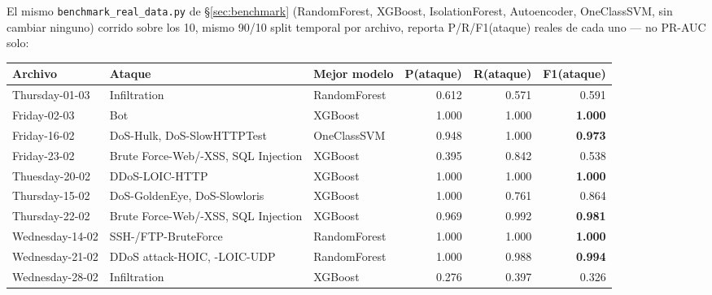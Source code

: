 \documentclass[11pt]{article}
\newcommand{\code}[1]{\texttt{\small #1}}
\begin{document}
El mismo \code{benchmark\_real\_data.py} de \S\ref{sec:benchmark} (RandomForest, XGBoost,
IsolationForest, Autoencoder, OneClassSVM, sin cambiar ninguno) corrido sobre los 10, mismo
90/10 split temporal por archivo, reporta P/R/F1(ataque) reales de cada uno --- no PR-AUC solo:

\begin{center}
\begin{longtable}{@{}lp{4.0cm}lrrr@{}}
\toprule
\textbf{Archivo} & \textbf{Ataque} & \textbf{Mejor modelo} & \textbf{P(ataque)} & \textbf{R(ataque)} & \textbf{F1(ataque)} \\
\midrule
\endhead
Thursday-01-03 & Infiltration & RandomForest & 0.612 & 0.571 & 0.591 \\
Friday-02-03 & Bot & XGBoost & 1.000 & 1.000 & \textbf{1.000} \\
Friday-16-02 & DoS-Hulk, DoS-SlowHTTPTest & OneClassSVM & 0.948 & 1.000 & \textbf{0.973} \\
Friday-23-02 & Brute Force-Web/-XSS, SQL Injection & XGBoost & 0.395 & 0.842 & 0.538 \\
Thuesday-20-02 & DDoS-LOIC-HTTP & XGBoost & 1.000 & 1.000 & \textbf{1.000} \\
Thursday-15-02 & DoS-GoldenEye, DoS-Slowloris & XGBoost & 1.000 & 0.761 & 0.864 \\
Thursday-22-02 & Brute Force-Web/-XSS, SQL Injection & XGBoost & 0.969 & 0.992 & \textbf{0.981} \\
Wednesday-14-02 & SSH-/FTP-BruteForce & RandomForest & 1.000 & 1.000 & \textbf{1.000} \\
Wednesday-21-02 & DDoS attack-HOIC, -LOIC-UDP & RandomForest & 1.000 & 0.988 & \textbf{0.994} \\
Wednesday-28-02 & Infiltration & XGBoost & 0.276 & 0.397 & 0.326 \\
\bottomrule
\end{longtable}
\end{center}
\end{document}

